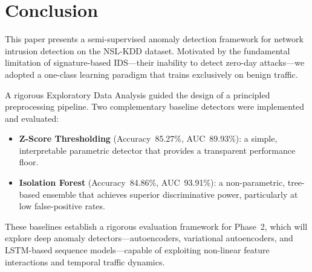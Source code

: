 \documentclass[conference]{IEEEtran}
\begin{document}
\section{Conclusion}
\label{sec:conclusion}

This paper presents a semi-supervised anomaly detection framework for network
intrusion detection on the NSL-KDD dataset.  Motivated by the fundamental
limitation of signature-based IDS---their inability to detect zero-day attacks---we
adopted a one-class learning paradigm that trains exclusively on benign traffic.

A rigorous Exploratory Data Analysis guided the design of a principled preprocessing
pipeline.  Two complementary baseline detectors were implemented and evaluated:

\begin{itemize}
  \item \textbf{Z-Score Thresholding} (Accuracy~85.27\%, AUC~89.93\%): a simple,
        interpretable parametric detector that provides a transparent performance floor.
  \item \textbf{Isolation Forest} (Accuracy~84.86\%, AUC~93.91\%): a non-parametric,
        tree-based ensemble that achieves superior discriminative power, particularly
        at low false-positive rates.
\end{itemize}

These baselines establish a rigorous evaluation framework for Phase~2, which will
explore deep anomaly detectors---autoencoders, variational autoencoders, and
LSTM-based sequence models---capable of exploiting non-linear feature interactions
and temporal traffic dynamics.
\end{document}
